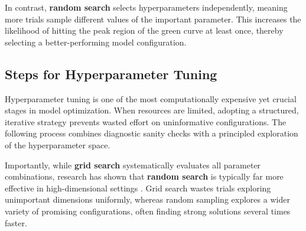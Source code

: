\noindent In contrast, \textbf{random search} selects hyperparameters independently, meaning more trials sample different values of the important parameter. This increases the likelihood of hitting the peak region of the green curve at least once, thereby selecting a better-performing model configuration.

\subsection{Steps for Hyperparameter Tuning}
\label{subsec:chapter10_hyperparam_tuning}

\noindent Hyperparameter tuning is one of the most computationally expensive yet crucial stages in model optimization.  
When resources are limited, adopting a structured, iterative strategy prevents wasted effort on uninformative configurations.  
The following process combines diagnostic sanity checks with a principled exploration of the hyperparameter space.  

\newpage

Importantly, while \textbf{grid search} systematically evaluates all parameter combinations, research has shown that \textbf{random search} is typically far more effective in high-dimensional settings \cite{bergstra2012_random}.  
Grid search wastes trials exploring unimportant dimensions uniformly, whereas random sampling explores a wider variety of promising configurations, often finding strong solutions several times faster.

